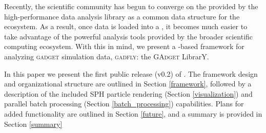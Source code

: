Recently, the scientific  community has begun to converge on the  provided by the high-performance  data analysis library as a common data structure for the ecosystem. 
As a result, once data is loaded into a , it becomes much easier to take advantage of the powerful analysis tools provided by the broader scientific computing ecosystem.
With this in mind, we present a -based framework for analyzing \textsc{gadget} simulation data, \textsc{gadfly}: the \textsc{GAdget}  LibrarY.

In this paper we present the first public release (v0.2) of . 
The framework design and organizational structure are outlined in Section \ref{framework}, followed by a description of the included SPH particle rendering (Section \ref{visualization}) and parallel batch processing (Section \ref{batch_processing}) capabilities.  Plans for added functionality are outlined in Section \ref{future}, and a summary is provided in Section \ref{summary}




